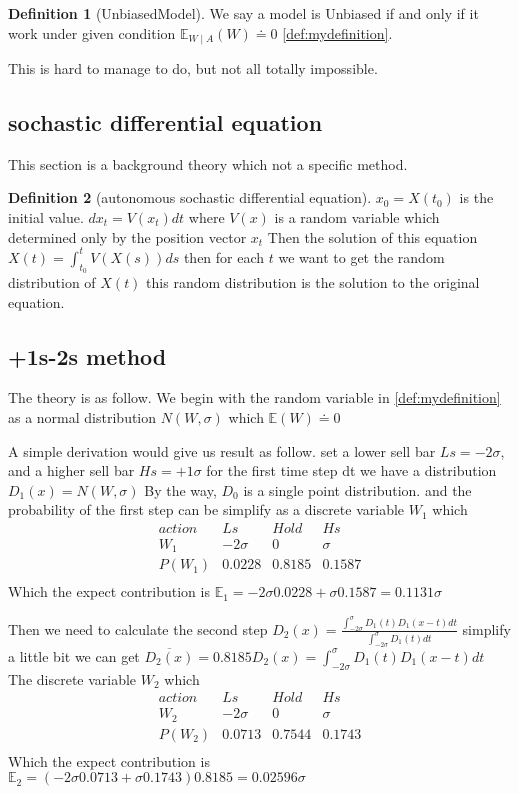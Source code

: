 \documentclass{article}
\theoremstyle{definition} %
\newtheorem{definition}{Definition}[section]
\begin{document}
\begin{definition}[UnbiasedModel]
    \label{def:UnbiasedModel}
    We say a model is Unbiased if and
    only if it work under given condition
    $\mathbb{E}_{W\mid A}(W)\doteq 0$
    \ref{def:mydefinition}.
\end{definition}

This is hard to manage to do, but not all totally
impossible.
\subsection{sochastic differential equation}
This section is a background theory which not
a specific method.
\begin{definition}[autonomous sochastic differential equation]
    \label{def:aSDE}
    $x_0=X(t_0)$ is the initial value.
    $dx_t=V(x_t)dt$
    where $V(x)$ is a random variable
    which determined only by the position
    vector $x_t$
    Then the solution of this equation
    $X(t)=\int_{t_0}^tV(X(s))ds$
    then for each $t$
    we want to get the random distribution of
    $X(t)$ this random distribution is
    the solution to the original equation.
\end{definition}

\subsection{+1s-2s method}
The theory is as follow.
We begin with the random variable in
\ref{def:mydefinition} as a normal distribution
$N(W,\sigma)$ which $\mathbb{E}(W)\doteq 0$

A simple derivation would give us result as follow.
set a lower sell bar $Ls=-2\sigma$,
and a higher sell bar $Hs=+1\sigma$
for the first time step dt we have a distribution
$D_1(x)=N(W,\sigma)$
By the way, $D_0$ is a single point distribution.
and the probability of the first step can
be simplify as a discrete variable $W_1$ which
$$
    \begin{array}{c|ccc}
        action & Ls       & Hold   & Hs     \\
        W_1    & -2\sigma & 0      & \sigma \\
        \hline
        P(W_1) & 0.0228   & 0.8185 & 0.1587 \\
    \end{array}
$$
Which the expect contribution is
$\mathbb{E}_1
    =-2\sigma0.0228+\sigma0.1587
    =0.1131\sigma$

Then we need to calculate the second step
$D_2(x)=
    \frac{\int_{-2\sigma}^{\sigma}D_1(t)D_1(x-t)dt}
    {\int_{-2\sigma}^{\sigma}D_1(t)dt}$
simplify a little bit we can get
$\overline{D_2(x)}=0.8185D_2(x)=
    \int_{-2\sigma}^{\sigma}D_1(t)D_1(x-t)dt$
The discrete variable $W_2$ which
$$
    \begin{array}{c|ccc}
        action & Ls       & Hold   & Hs     \\
        W_2    & -2\sigma & 0      & \sigma \\
        \hline
        P(W_2) & 0.0713   & 0.7544 & 0.1743 \\
    \end{array}
$$
Which the expect contribution is
$\mathbb{E}_2
    =(-2\sigma0.0713+\sigma0.1743)0.8185
    =0.02596\sigma$
\end{document}
